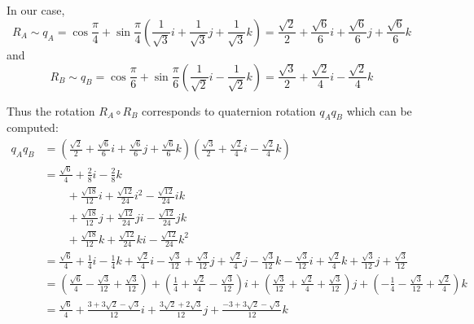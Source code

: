 \documentclass[12pt]{article}
\begin{document}
        In our case, 
        \[R_A \sim q_A = \cos \frac{\pi}{4} + \sin \frac{\pi}{4} (\frac{1}{\sqrt{3}}i + \frac{1}{\sqrt{3}}j + \frac{1}{\sqrt{3}}k) = \frac{\sqrt 2}{2} + \frac{\sqrt 6}{6}i + \frac{\sqrt 6}{6}j + \frac{\sqrt 6}{6}k\]
        and 
        \[R_B \sim q_B = \cos \frac{\pi}{6} + \sin \frac{\pi}{6} (\frac{1}{\sqrt 2}i - \frac{1}{\sqrt 2}k) = \frac{\sqrt 3}{2} + \frac{\sqrt{2}}{4}i - \frac{\sqrt{2}}{4}k\]

        Thus the rotation $R_A \circ R_B$ corresponds to quaternion rotation $q_A q_B$ which can be computed: 
        \begin{align*}
            q_A q_B &= \left(\frac{\sqrt 2}{2} + \frac{\sqrt 6}{6}i + \frac{\sqrt 6}{6}j + \frac{\sqrt 6}{6}k\right)\left(\frac{\sqrt 3}{2} + \frac{\sqrt{2}}{4}i - \frac{\sqrt{2}}{4}k\right)\\ 
            &= \frac{\sqrt 6}{4} + \frac{2}{8}i - \frac{2}{8}k\\ 
                &\qquad + \frac{\sqrt{18}}{12}i + \frac{\sqrt{12}}{24}i^2 - \frac{\sqrt{12}}{24}ik\\ 
                &\qquad + \frac{\sqrt{18}}{12}j + \frac{\sqrt{12}}{24}ji - \frac{\sqrt{12}}{24} jk\\ 
                &\qquad + \frac{\sqrt{18}}{12}k + \frac{\sqrt{12}}{24}ki - \frac{\sqrt{12}}{24}k^2\\ 
            &= \frac{\sqrt 6}{4} + \frac{1}{4}i - \frac{1}{4}k + \frac{\sqrt 2}{4}i - \frac{\sqrt 3}{12} + \frac{\sqrt 3}{12}j + \frac{\sqrt 2}{4}j - \frac{\sqrt 3}{12}k - \frac{\sqrt 3}{12}i + \frac{\sqrt 2}{4}k + \frac{\sqrt 3}{12}j + \frac{\sqrt 3}{12}\\ 
            &= \left(\frac{\sqrt 6}{4} - \frac{\sqrt 3}{12} + \frac{\sqrt 3}{12}\right) + \left(\frac{1}{4} + \frac{\sqrt 2}{4} - \frac{\sqrt 3}{12}\right)i + \left(\frac{\sqrt 3}{12} + \frac{\sqrt 2}{4}+ \frac{\sqrt 3}{12}\right)j + \left(-\frac{1}{4} - \frac{\sqrt 3}{12} + \frac{\sqrt 2}{4}\right)k\\ 
            &= \frac{\sqrt 6}{4} + \frac{3 + 3\sqrt 2 - \sqrt 3}{12}i + \frac{3\sqrt 2 + 2\sqrt 3}{12}j + \frac{-3 + 3\sqrt 2 - \sqrt 3}{12}k 
        \end{align*}
\end{document}
